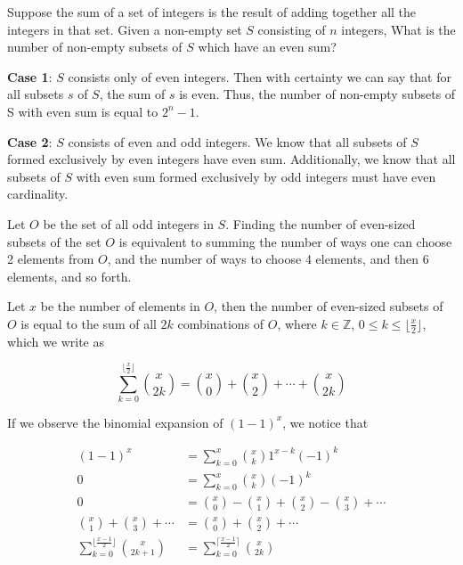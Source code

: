 \documentclass{article}
\begin{document}
Suppose the sum of a set of integers is the result of adding together all the integers in that set. Given a non-empty set $S$ consisting of $n$ integers, What is the number of non-empty subsets of $S$ which have an even sum? 

\vspace{5mm}

\textbf{Case 1}: $S$ consists only of even integers. Then with certainty we can say that for all subsets $s$ of $S$, the sum of $s$ is even. Thus, the number of non-empty subsets of S with even sum is equal to $2^{n}-1$.

\vspace{5mm}

\textbf{Case 2}: $S$ consists of even and odd integers. We know that all subsets of $S$ formed exclusively by even integers have even sum. Additionally, we know that all subsets of $S$ with even sum formed exclusively by odd integers must have even cardinality. 

\vspace{5mm}

Let $O$ be the set of all odd integers in $S$. Finding the number of even-sized subsets of the set $O$ is equivalent to summing the number of ways one can choose 2 elements from $O$, and the number of ways to choose 4 elements, and then 6 elements, and so forth. 
\vspace{5mm}

Let $x$ be the number of elements in $O$, then the number of even-sized subsets of $O$ is equal to the sum of all $2k$ combinations of $O$, where $k \in \mathbb{Z}$, $0 \le k \le \lfloor \frac{x}{2} \rfloor$, which we write as

\begin{equation}
\displaystyle\sum_{k=0}^{\lfloor \frac{x}{2} \rfloor} \binom{x}{2k} = \binom{x}{0} + \binom{x}{2} + \cdots + \binom{x}{2k}
\end{equation}

\vspace{5mm}

If we observe the binomial expansion of $(1-1)^{x}$, we notice that

  \begin{align*}
    (1-1)^{x} &= \displaystyle\sum_{k=0}^{x} \binom{x}{k}1^{x-k}(-1)^{k}\\
    0 &= \displaystyle\sum_{k=0}^{x} \binom{x}{k}(-1)^{k}\\
    0 &= \binom{x}{0} - \binom{x}{1} + \binom{x}{2} - \binom{x}{3} + \cdots \\
    \binom{x}{1} +  \binom{x}{3} + \cdots &= \binom{x}{0} + \binom{x}{2}+ \cdots\\
    \displaystyle\sum_{k=0}^{\lfloor \frac{x-1}{2} \rfloor} \binom{x}{2k+1} &=   \displaystyle\sum_{k=0}^{\lceil \frac{x-1}{2} \rceil} \binom{x}{2k}\\
  \end{align*}
  
\end{document}
